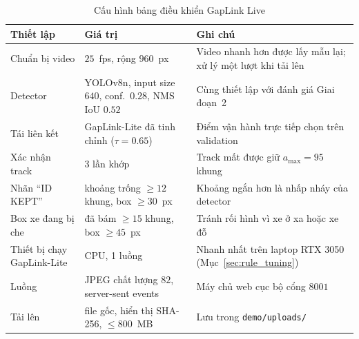 \begin{table}[H]
    \centering
    \caption{Cấu hình bảng điều khiển GapLink Live}
    \label{tab:vms_cfg}
    \begin{tabularx}{\textwidth}{l >{\raggedright\arraybackslash}p{5.4cm} >{\raggedright\arraybackslash}X}
        \toprule
        \textbf{Thiết lập} & \textbf{Giá trị} & \textbf{Ghi chú} \\
        \midrule
        Chuẩn bị video & $25$~fps, rộng $960$~px & Video nhanh hơn được lấy mẫu lại; xử lý một lượt khi tải lên \\
        Detector & YOLOv8n, input size $640$, conf.\ $0.28$, NMS IoU $0.52$ & Cùng thiết lập với đánh giá Giai đoạn~2 \\
        Tái liên kết & GapLink-Lite đã tinh chỉnh ($\tau = 0.65$) & Điểm vận hành trực tiếp chọn trên validation \\
        Xác nhận track & $3$ lần khớp & Track mất được giữ $a_{\max} = 95$ khung \\
        Nhãn ``ID KEPT'' & khoảng trống $\ge 12$ khung, box $\ge 30$~px & Khoảng ngắn hơn là nhấp nháy của detector \\
        Box xe đang bị che & đã bám $\ge 15$ khung, box $\ge 45$~px & Tránh rối hình vì xe ở xa hoặc xe đỗ \\
        Thiết bị chạy GapLink-Lite & CPU, 1 luồng & Nhanh nhất trên laptop RTX 3050 (Mục~\ref{sec:rule_tuning}) \\
        Luồng & JPEG chất lượng $82$, server-sent events & Máy chủ web cục bộ cổng $8001$ \\
        Tải lên & file gốc, hiển thị SHA-256, $\le 800$~MB & Lưu trong \texttt{demo/uploads/} \\
        \bottomrule
    \end{tabularx}
\end{table}
